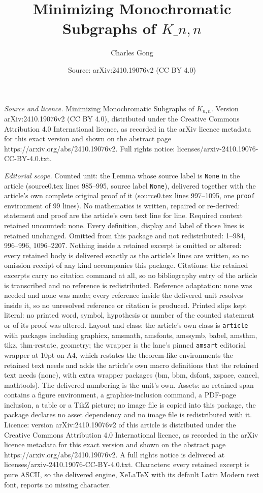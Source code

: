 \documentclass[10pt,a4paper]{amsart}
\title[Minimizing Monochromatic Subgraphs of $K\_{n,n}$]{Minimizing Monochromatic Subgraphs of $K\_{n,n}$}
\author{Charles Gong}
\date{Source: arXiv:2410.19076v2 (CC BY 4.0)}
\begin{document}
\maketitle

\noindent\emph{Source and licence.} Minimizing Monochromatic Subgraphs of $K_{n,n}$. Version arXiv:2410.19076v2 (CC BY 4.0), distributed under the Creative Commons Attribution 4.0 International licence, as recorded in the arXiv licence metadata for this exact version and shown on the abstract page https://arxiv.org/abs/2410.19076v2. Full rights notice: licenses/arxiv-2410.19076-CC-BY-4.0.txt.\par\smallskip

\noindent\textit{Editorial scope.} Counted unit: the Lemma whose source label is \texttt{None} in the article (source0.tex lines 985--995, source label \texttt{None}), delivered together with the article's own complete original proof of it (source0.tex lines 997--1095, one \texttt{proof} environment of 99 lines). No mathematics is written, repaired or re-derived: statement and proof are the article's own text line for line. Required context retained uncounted: none. Every definition, display and label of those lines is retained unchanged. Omitted from this package and not redistributed: 1--984, 996--996, 1096--2207. Nothing inside a retained excerpt is omitted or altered: every retained body is delivered exactly as the article's lines are written, so no omission receipt of any kind accompanies this package. Citations: the retained excerpts carry no citation command at all, so no bibliography entry of the article is transcribed and no reference is redistributed. Reference adaptation: none was needed and none was made; every reference inside the delivered unit resolves inside it, so no unresolved reference or citation is produced. Printed slips kept literal: no printed word, symbol, hypothesis or number of the counted statement or of its proof was altered. Layout and class: the article's own class is \texttt{article} with packages including graphicx, amsmath, amsfonts, amssymb, babel, amsthm, tikz, thm-restate, geometry; the wrapper is the lane's pinned \texttt{amsart} editorial wrapper at 10pt on A4, which restates the theorem-like environments the retained text needs and adds the article's own macro definitions that the retained text needs (none), with extra wrapper packages (bm, bbm, dsfont, xspace, cancel, mathtools). The delivered numbering is the unit's own. Assets: no retained span contains a figure environment, a graphics-inclusion command, a PDF-page inclusion, a table or a TikZ picture; no image file is copied into this package, the package declares no asset dependency and no image file is redistributed with it. Licence: version arXiv:2410.19076v2 of this article is distributed under the Creative Commons Attribution 4.0 International licence, as recorded in the arXiv licence metadata for this exact version and shown on the abstract page https://arxiv.org/abs/2410.19076v2. A full rights notice is delivered at licenses/arxiv-2410.19076-CC-BY-4.0.txt. Characters: every retained excerpt is pure ASCII, so the delivered engine, XeLaTeX with its default Latin Modern text font, reports no missing character.
\end{document}
